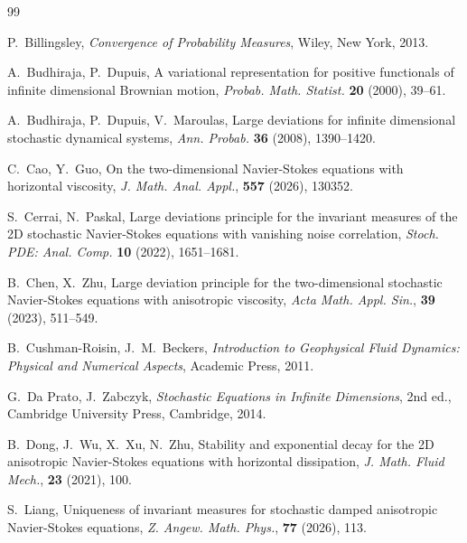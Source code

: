 \documentclass[11pt,a4paper,reqno]{amsart}
\theoremstyle{definition}
\begin{document}
\begin{thebibliography}{99}

 P.~Billingsley, \emph{Convergence of Probability Measures}, Wiley, New York, 2013.

 A.~Budhiraja, P.~Dupuis, A variational representation for positive functionals
  of infinite dimensional Brownian motion, \emph{Probab. Math. Statist.} \textbf{20} (2000), 39--61.

 A.~Budhiraja, P.~Dupuis, V.~Maroulas, Large deviations for infinite dimensional
  stochastic dynamical systems, \emph{Ann. Probab.} \textbf{36} (2008), 1390--1420.

 C.~Cao, Y.~Guo,
  On the two-dimensional Navier-Stokes equations with horizontal viscosity,
  \emph{J. Math. Anal. Appl.}, \textbf{557} (2026), 130352.

 S.~Cerrai, N.~Paskal, Large deviations principle for the invariant measures of the 2D
  stochastic Navier-Stokes equations with vanishing noise correlation, \emph{Stoch. PDE: Anal. Comp.}
  \textbf{10} (2022), 1651--1681.

 B.~Chen, X.~Zhu,
  Large deviation principle for the two-dimensional stochastic Navier-Stokes equations
  with anisotropic viscosity,
  \emph{Acta Math. Appl. Sin.}, \textbf{39} (2023), 511--549.

 B.~Cushman-Roisin, J.~M.~Beckers, \emph{Introduction to Geophysical Fluid Dynamics: Physical and Numerical Aspects}, Academic Press, 2011.


 G.~Da Prato, J.~Zabczyk, \emph{Stochastic Equations in Infinite Dimensions},
  2nd ed., Cambridge University Press, Cambridge, 2014.

 B.~Dong, J.~Wu, X.~Xu, N.~Zhu,
  Stability and exponential decay for the 2D anisotropic Navier-Stokes
  equations with horizontal dissipation,
  \emph{J. Math. Fluid Mech.}, \textbf{23} (2021), 100.



 S.~Liang,
  Uniqueness of invariant measures for stochastic damped anisotropic
  Navier-Stokes equations,
  \emph{Z. Angew. Math. Phys.}, \textbf{77} (2026), 113.



\end{thebibliography}
\end{document}

